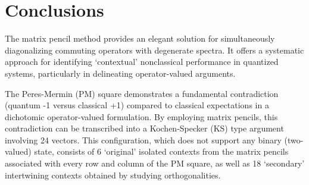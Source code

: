 \documentclass[
  twocolumn,
 showpacs,
 showkeys,
 preprintnumbers,
 amsmath,amssymb,
 aps,
 pra,
  longbibliography,
 floatfix,
 ]{revtex4-2}
\newcommand\myotimes{ }
\begin{document}
%



\section{Conclusions}

The matrix pencil method provides an elegant solution for simultaneously diagonalizing commuting operators with degenerate spectra.
It offers a systematic approach for identifying `contextual' nonclassical performance in quantized systems,
particularly in delineating operator-valued arguments.

The Peres-Mermin (PM) square demonstrates a fundamental contradiction (quantum -1 versus classical +1) compared to classical expectations in a dichotomic operator-valued formulation. By employing matrix pencils, this contradiction can be transcribed into a Kochen-Specker (KS) type argument involving 24 vectors. This configuration, which does not support any binary (two-valued) state, consists of 6 `original' isolated contexts from the matrix pencils associated with every row and column of the PM square, as well as 18 `secondary' intertwining contexts obtained by studying orthogonalities.
\end{document}
